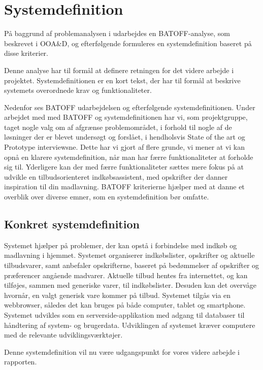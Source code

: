 \section{Systemdefinition}\label{sysdeffi}
På baggrund af problemanalysen i  udarbejdes en BATOFF-analyse, som beskrevet i OOA\&D\citep{OOA&D2001}, og efterfølgende formuleres en systemdefinition baseret på disse kriterier.

Denne analyse har til formål at definere retningen for det videre arbejde i projektet.
Systemdefinitionen er en kort tekst, der har til formål at beskrive systemets overordnede krav og funktionaliteter.

Nedenfor ses BATOFF udarbejdelsen og efterfølgende systemdefinitionen.
Under arbejdet med med BATOFF og systemdefinitionen har vi, som  projektgruppe, taget nogle valg om af afgrænse problemområdet, i forhold til nogle af de løsninger der er blevet undersøgt og forslået, i hendholsvis State of the art og Prototype interviewsne.
Dette har vi gjort af flere grunde, vi mener at vi kan opnå en klarere systemdefinition, når man har færre funktionaliteter at forholde sig til.
Yderligere kan der med færre funktionaliteter sættes mere fokus på at udvikle en tilbudsorienteret indkøbsassistent, med opskrifter der danner inspiration til din madlavning.
BATOFF kriterierne hjælper med at danne et overblik over diverse emner, som en systemdefinition bør omfatte.




\subsection{Konkret systemdefinition}\label{Sysdef}

Systemet hjælper på problemer, der kan opstå i forbindelse med indkøb og madlavning i hjemmet.
Systemet organiserer indkøbslister, opskrifter og aktuelle tilbudsvarer, samt anbefaler opskrifterne, baseret på bedømmelser af opskrifter og præferencer angående madvarer.
Aktuelle tilbud hentes fra internettet, og kan tilføjes, sammen med generiske varer, til indkøbslister.
Desuden kan det overvåge hvornår, en valgt generisk vare kommer på tilbud.
Systemet tilgås via en webbrowser, således det kan bruges på både computer, tablet og smartphone.
Systemet udvikles som en serverside-applikation med adgang til databaser til håndtering af system- og brugerdata.
Udviklingen af systemet kræver computere med de relevante udviklingsværktøjer.

Denne systemdefinition vil nu være udgangspunkt for vores videre arbejde i rapporten.

